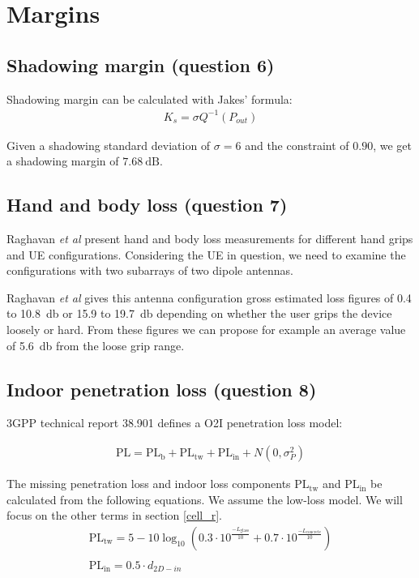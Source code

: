 \documentclass{article}
\begin{document}
\section{Margins}
\subsection{Shadowing margin (question 6)}
Shadowing margin can be calculated with Jakes' formula:
\begin{align*}
      K_s= \sigma Q^{-1}(P_{out})
\end{align*}

Given a shadowing standard deviation of \(\sigma = 6\) and the constraint of \(0.90\), we get a shadowing margin of \(\SI{7.68}{\deci\bel}\).

\subsection{Hand and body loss (question 7)}
Raghavan \textit{et al} present hand and body loss measurements for different hand grips and UE configurations. Considering the UE in question, we need to examine the configurations with two subarrays of two dipole antennas.

Raghavan \textit{et al} gives this antenna configuration gross estimated loss figures of 0.4 to \SI{10.8}{\decibel} or 15.9 to \SI{19.7}{\decibel} depending on whether the user grips the device loosely or hard. From these figures we can propose for example an average value of \SI{5.6}{\decibel} from the loose grip range. 
\subsection{Indoor penetration loss (question 8)}
\label{indoor}
3GPP technical report 38.901 defines a O2I penetration loss model:

\begin{align*}
    \mathrm{PL} = \mathrm{PL_b} + \mathrm{PL_{tw}} + \mathrm{PL_{in}} + N(0, \sigma^2_P)
\end{align*}

The missing penetration loss and indoor loss components \(\mathrm{PL_{tw}}\) and \(\mathrm{PL_{in}}\) be calculated from the following equations. We assume the low-loss model. We will focus on the other terms in section \ref{cell_r}.
\begin{gather*}
    \mathrm{PL_{tw}} = 5-10\log_{10} (0.3 \cdot 10^{\frac{-L_{\mathrm{glass}}}{10}} + 0.7 \cdot 10^{\frac{-L_{\mathrm{concrete}}}{10}}) \\ \\
    \mathrm{PL_{in}} = 0.5 \cdot d_{2D-in}
\end{gather*}
\end{document}
